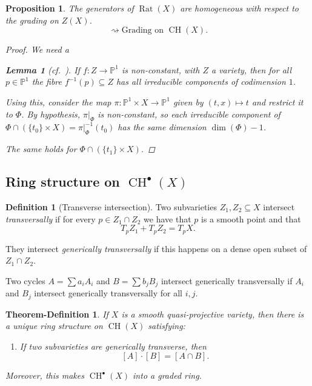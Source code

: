 \documentclass[12pt,a4paper]{amsart}
\theoremstyle{plain}
\newtheorem{thmdefn}[thm]{Theorem-Definition}
\newtheorem{lm}[thm]{Lemma}
\newtheorem{prop}[thm]{Proposition}
\theoremstyle{definition}
\newtheorem{defn}[thm]{Definition}
\theoremstyle{remark}
\begin{document}
\begin{prop}
    The generators of $\operatorname{Rat}(X)$ are homogeneous with respect to the grading on $Z(X)$.
    \[ \rightsquigarrow \text{Grading on }\operatorname{CH}(X). \]
    \begin{proof}
	We need a
	\begin{lm}[{cf.~\cite[Theorem 0.2]{eh16}}]
	    If $f\colon Z\to \mathbb{P}^{1}$ is non-constant, with $Z$ a variety, then for all $p\in \mathbb{P}^{1}$ the fibre $f^{-1}(p)\subseteq Z$ has all irreducible components of codimension $1$.
	\end{lm}
	Using this, consider the map $\pi\colon \mathbb{P}^{1}\times X\to \mathbb{P}^{1}$ given by $(t,x)\mapsto t$ and restrict it to $\Phi$.
	By hypothesis, $\pi|_{\Phi}$ is non-constant, so each irreducible component of $\Phi\cap (\{t_{0}\}\times X)=\pi|_{\Phi}^{-1}(t_{0})$ has the same dimension $\dim(\Phi)-1$.

	The same holds for $\Phi\cap (\{t_{1}\}\times X)$.
    \end{proof}
\end{prop}

\subsection{Ring structure on $\operatorname{CH}^{\bullet}(X)$}

\begin{defn}[Transverse intersection]
    Two subvarieties $Z_{1},Z_{2}\subseteq X$ intersect \textit{transversally} if for every $p\in Z_{1}\cap Z_{2}$ we have that $p$ is a smooth point and that
    \[ T_{p}Z_{1}+T_{p}Z_{2}=T_{p}X. \]

    They intersect \textit{generically transversally} if this happens on a dense open subset of $Z_{1}\cap Z_{2}$.

    Two cycles $A=\sum a_{i}A_{i}$ and $B=\sum b_{j}B_{j}$ intersect generically transversally if $A_{i}$ and $B_{j}$ intersect generically transversally for all $i,j$.
\end{defn}

\begin{thmdefn}
    If $X$ is a smooth quasi-projective variety, then there is a unique ring structure on $\operatorname{CH}(X)$ satisfying:
    \begin{enumerate}[label=$(\star)$]
	\item If two subvarieties are generically transverse, then
	    \[ [A]\cdot [B]=[A\cap B]. \]
    \end{enumerate}
    Moreover, this makes $\operatorname{CH}^{\bullet}(X)$ into a graded ring.
\end{thmdefn}
\end{document}
